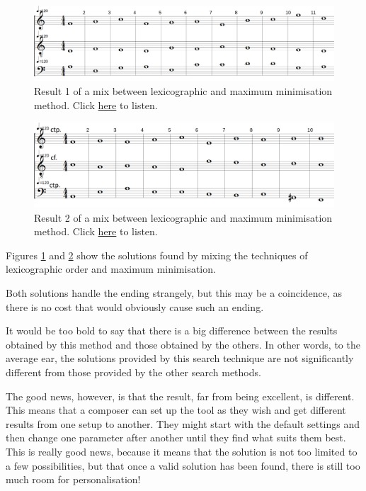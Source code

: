 \begin{figure}[h]
    \centering
    \includegraphics[width=1\textwidth]{Images/Experiments/min-1sp.png}
    \caption{Result 1 of a mix between lexicographic and maximum minimisation method. Click \href{https://example.com/}{here} to listen.}
    \label{fig:min-sp}
\end{figure} 
\begin{figure}[h]
    \centering
    \includegraphics[width=1\textwidth]{Images/Experiments/min-1sp0.png}
    \caption{Result 2 of a mix between lexicographic and maximum minimisation method. Click \href{https://youtu.be/GRGE7NN3jNE}{here} to listen.}
    \label{fig:min-sp0}
\end{figure}

Figures \ref{fig:min-sp} and \ref{fig:min-sp0} show the solutions found by mixing the techniques of lexicographic order and maximum minimisation.

Both solutions handle the ending strangely, but this may be a coincidence, as there is no cost that would obviously cause such an ending.

It would be too bold to say that there is a big difference between the results obtained by this method and those obtained by the others. In other words, to the average ear, the solutions provided by this search technique are not significantly different from those provided by the other search methods.


The good news, however, is that the result, far from being excellent, is different. This means that a composer can set up the tool as they wish and get different results from one setup to another. They might start with the default settings and then change one parameter after another until they find what suits them best. This is really good news, because it means that the solution is not too limited to a few possibilities, but that once a valid solution has been found, there is still too much room for personalisation!


